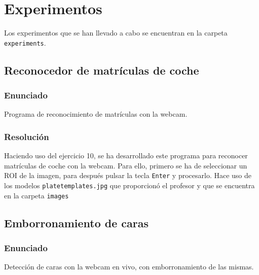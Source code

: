 \documentclass[a4paper,10pt,titlepage,oneside,openright]{book}
\begin{document}
\medskip
\section{Experimentos}
Los experimentos que se han llevado a cabo se encuentran en la carpeta \texttt{experiments}.

\medskip
\subsection{Reconocedor de matrículas de coche}

\subsubsection*{Enunciado}
Programa de reconocimiento de matrículas con la webcam.

\subsubsection*{Resolución}
Haciendo uso del ejercicio 10, se ha desarrollado este programa para reconocer matrículas de coche con la webcam. Para ello, primero se ha de seleccionar un ROI de la imagen, para después pulsar la tecla \texttt{Enter} y procesarlo. Hace uso de los modelos \texttt{platetemplates.jpg} que proporcionó el profesor y que se encuentra en la carpeta \texttt{images}



\medskip
\subsection{Emborronamiento de caras}

\subsubsection*{Enunciado}
Detección de caras con la webcam en vivo, con emborronamiento de las mismas.

\end{document}

